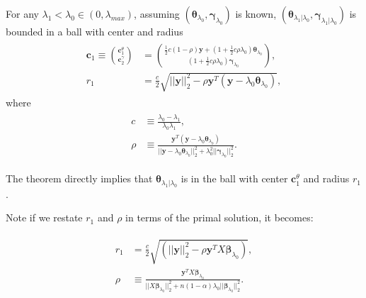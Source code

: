 \begin{theorem}
    \label{thm:1.1}
    For any $\lambda_1<\lambda_{0}\in (0,\lambda_{max})$, assuming $(\boldsymbol\theta_{\lambda_0},\boldsymbol\gamma_{\lambda_0})$ is known, $(\boldsymbol\theta_{\lambda_1|\lambda_0},\boldsymbol\gamma_{\lambda_1|\lambda_0})$ is bounded in a ball with center and radius
    \begin{gather}
        \begin{aligned}
            \boldsymbol c_1\equiv\binom{\boldsymbol c_1^\theta}{\boldsymbol c_2^\gamma}&=\binom{\frac{1}{2}c(1-\rho)\boldsymbol y+(1+\frac{1}{2}c\rho\lambda_0)\boldsymbol\theta_{\lambda_0}}{(1+\frac{1}{2}c\rho\lambda_0)\boldsymbol\gamma_{\lambda_0}},\\
            r_1&=\frac{c}{2}\sqrt{||\boldsymbol y||_2^2-\rho \boldsymbol y^T(\boldsymbol y-\lambda_0\boldsymbol\theta_{\lambda_0})},
        \end{aligned}
    \end{gather}
    where
    \begin{gather}
        \begin{aligned}
            c&\equiv\frac{\lambda_0-\lambda_1}{\lambda_0\lambda_1},\\
            \rho&\equiv\frac{\boldsymbol y^T(\boldsymbol y-\lambda_0\boldsymbol\theta_{\lambda_0})}{||\boldsymbol y-\lambda_0\boldsymbol\theta_{\lambda_0}||_2^2+\lambda_0^2||\boldsymbol\gamma_{\lambda_0}||_2^2}.\nonumber
        \end{aligned}
    \end{gather}
\end{theorem}

The theorem  directly implies that $\boldsymbol\theta_{\lambda_1|\lambda_0}$ is in the ball with center $\boldsymbol c_1^\theta$ and radius $r_1$.

Note if we restate $r_1$ and $\rho$ in terms of the primal solution, it becomes:

\begin{gather}
    \label{eq:thm1prim}
    \begin{aligned}
        r_1&=\frac{c}{2}\sqrt{(||\boldsymbol y||_2^2-\rho \boldsymbol y^TX\boldsymbol\beta_{\lambda_0})},\\
        \rho&\equiv\frac{\boldsymbol y^TX\boldsymbol\beta_{\lambda_0}}{||X\boldsymbol\beta_{\lambda_0}||_2^2+n(1-\alpha)\lambda_0||\boldsymbol\beta_{\lambda_0}||_2^2}.
    \end{aligned}
\end{gather}

